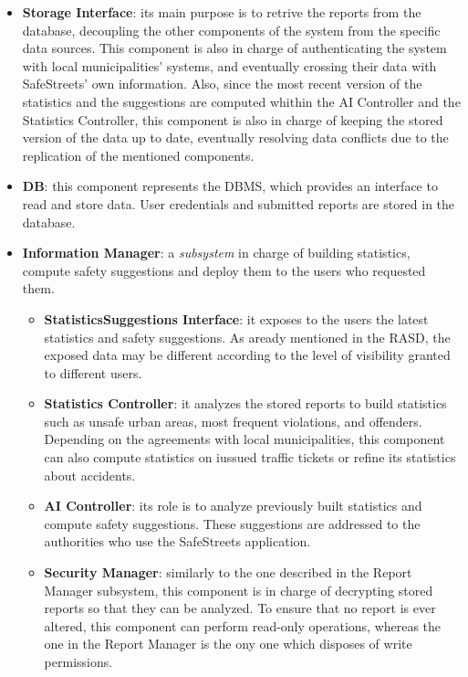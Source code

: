 \documentclass{report}
\begin{document}
\begin{itemize}
\begin{itemize}
\end{itemize}
\item \textbf{Storage Interface}: its main purpose is to retrive the reports from the database, decoupling the other components of the system from the specific data sources. This component is also in charge of authenticating the system with local municipalities' systems, and eventually crossing their data with SafeStreets' own information. Also, since the most recent version of the statistics and the suggestions are computed whithin the AI Controller and the Statistics Controller, this component is also in charge of keeping the stored version of the data up to date, eventually resolving data conflicts due to the replication of the mentioned components.
\item \textbf{DB}: this component represents the DBMS, which provides an interface to read and store data. User credentials and submitted reports are stored in the database.
\item \textbf{Information Manager}: a \textit{subsystem} in charge of building statistics, compute safety suggestions and deploy them to the users who requested them.
    \begin{itemize}
        \item \textbf{StatisticsSuggestions Interface}: it exposes to the users the latest statistics and safety suggestions. As aready mentioned in the RASD, the exposed data may be different according to the level of visibility granted to different users.
        \item \textbf{Statistics Controller}: it analyzes the stored reports to build statistics such as unsafe urban areas, most frequent violations, and offenders. Depending on the agreements with local municipalities, this component can also compute statistics on iussued traffic tickets or refine its statistics about accidents.
        \item \textbf{AI Controller}: its role is to analyze previously built statistics and compute safety suggestions. These suggestions are addressed to the authorities who use the SafeStreets application.
        \item \textbf{Security Manager}: similarly to the one described in the Report Manager subsystem, this component is in charge of decrypting stored reports so that they can be analyzed. To ensure that no report is ever altered, this component can perform read-only operations, whereas the one in the Report Manager is the ony one which disposes of write permissions.
    \end{itemize}

\end{itemize}
\end{document}
